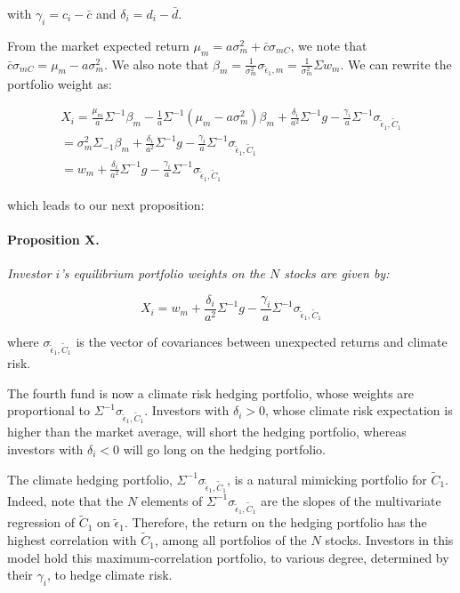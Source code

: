 with $\gamma_i = c_i - \bar{c}$ and $\delta_i = d_i - \bar{d}$.

From the market expected return $\mu_m = a \sigma^2_m + \bar{c} \sigma_{mC}$,
we note that $\bar{c} \sigma_{mC} = \mu_m - a \sigma^2_m$.
We also note that $\beta_m = \frac{1}{\sigma^2_m} \sigma_{\tilde{\epsilon}_1, m} = \frac{1}{\sigma^2_m} \Sigma w_m$.
We can rewrite the portfolio weight as:

\begin{equation}
    \begin{aligned}
        X_i = \frac{\mu_m}{a} \Sigma^{-1} \beta_m - \frac{1}{a} \Sigma^{-1} (\mu_m - a \sigma^2_m)\beta_m + \frac{\delta_i}{a^2}\Sigma^{-1}g - \frac{\gamma_i}{a}\Sigma^{-1}\sigma_{\tilde{\epsilon}_1, \tilde{C}_1} \\
        = \sigma^{2}_m \Sigma_{-1} \beta_m + \frac{\delta_i}{a^2}\Sigma^{-1}g - \frac{\gamma_i}{a}\Sigma^{-1}\sigma_{\tilde{\epsilon}_1, \tilde{C}_1} \\
        = w_m + \frac{\delta_i}{a^2}\Sigma^{-1}g - \frac{\gamma_i}{a}\Sigma^{-1}\sigma_{\tilde{\epsilon}_1, \tilde{C}_1}
    \end{aligned}
\end{equation}

which leads to our next proposition:

\paragraph{Proposition X.}
\textit{Investor $i$'s equilibrium portfolio weights 
on the $N$ stocks are given by:}

\begin{equation}
    X_i = w_m + \frac{\delta_i}{a^2}\Sigma^{-1}g - \frac{\gamma_i}{a}\Sigma^{-1}\sigma_{\tilde{\epsilon}_1, \tilde{C}_1}
\end{equation}

where $\sigma_{\tilde{\epsilon}_1, \tilde{C}_1}$ is the vector of
covariances between unexpected returns and climate risk.

The fourth fund is now a climate risk hedging portfolio,
whose weights are proportional to $\Sigma^{-1}\sigma_{\tilde{\epsilon}_1, \tilde{C}_1}$.
Investors with $\delta_i > 0$, whose climate risk expectation 
is higher than the market average, 
will short the hedging portfolio, whereas investors with
$\delta_i < 0$ will go long on the hedging portfolio.

The climate hedging portfolio, $\Sigma^{-1}\sigma_{\tilde{\epsilon}_1, \tilde{C}_1}$,
is a natural mimicking portfolio for $\tilde{C}_1$.
Indeed, note that the $N$ elements of $\Sigma^{-1}\sigma_{\tilde{\epsilon}_1, \tilde{C}_1}$
are the slopes of the multivariate regression of $\tilde{C}_1$ on $\tilde{\epsilon}_1$.
Therefore, the return on the hedging portfolio 
has the highest correlation with $\tilde{C}_1$,
among all portfolios of the $N$ stocks. 
Investors in this model hold this maximum-correlation 
portfolio, to various degree, determined by their 
$\gamma_i$, to hedge climate risk. 
